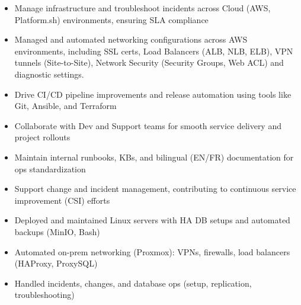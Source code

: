 \documentclass[10pt,a4paper,ragged2e,withhyper]{altacv}
\begin{document}


\makecvheader


\begin{paracol}{2}



\begin{itemize}
\item Manage infrastructure and troubleshoot incidents across Cloud (AWS, Platform.sh) environments, ensuring SLA compliance
\item Managed and automated networking configurations across AWS environments, including SSL certs, Load Balancers (ALB, NLB, ELB), VPN tunnels (Site-to-Site), Network Security (Security Groups, Web ACL) and diagnostic settings.
\item Drive CI/CD pipeline improvements and release automation using tools like Git, Ansible, and Terraform
\item Collaborate with Dev and Support teams for smooth service delivery and project rollouts
\item Maintain internal runbooks, KBs, and bilingual (EN/FR) documentation for ops standardization
\item Support change and incident management, contributing to continuous service improvement (CSI) efforts
\end{itemize}

\divider

\begin{itemize}
\item Deployed and maintained Linux servers with HA DB setups and automated backups (MinIO, Bash)

\item Automated on-prem networking (Proxmox): VPNs, firewalls, load balancers (HAProxy, ProxySQL)

\item Handled incidents, changes, and database ops (setup, replication, troubleshooting)


\end{itemize}
\end{paracol}
\end{document}

